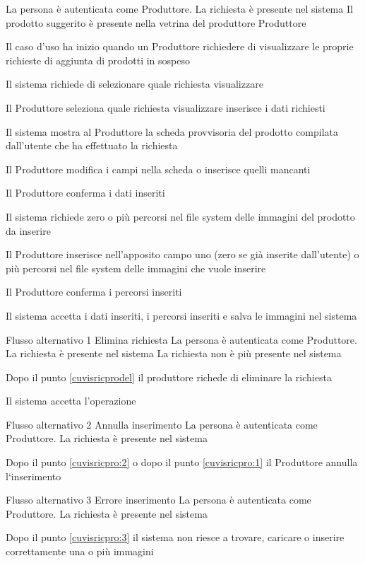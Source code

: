 {}
{La persona è autenticata come Produttore. La richiesta è presente nel sistema}
{Il prodotto suggerito è presente nella vetrina del produttore Produttore}
{\begin{enumCU}
		\item Il caso d'uso ha inizio quando un Produttore richiedere di visualizzare le proprie richieste di aggiunta di prodotti in sospeso
		\item Il sistema richiede di selezionare quale richiesta visualizzare
		\item Il Produttore seleziona quale richiesta visualizzare inserisce i dati richiesti 
		\item Il sistema mostra al Produttore la scheda provvisoria del prodotto compilata dall'utente che ha effettuato la richiesta \label{cuvisricprodel}
		\item Il Produttore modifica i campi nella scheda o inserisce quelli mancanti \label{cuvisricpro:1}
		\item Il Produttore conferma i dati inseriti
		\item Il sistema richiede zero o più percorsi nel file system delle immagini del prodotto da inserire
		\item Il Produttore inserisce nell'apposito campo uno (zero se già inserite dall'utente) o più percorsi nel file system delle immagini che vuole inserire \label{cuvisricpro:2}
		\item Il Produttore conferma i percorsi inseriti \label{cuvisricpro:3}
		\item Il sistema accetta i dati inseriti, i percorsi inseriti e salva le immagini nel sistema
	\end{enumCU}}
%
{Flusso alternativo 1}%
{Elimina richiesta}%
{La persona è autenticata come Produttore. La richiesta è presente nel sistema}%
{La richiesta non è più presente nel sistema}%
{\begin{enumCU}
		\item Dopo il punto \ref{cuvisricprodel} il produttore richede di eliminare la richiesta
		\item Il sistema accetta l'operazione
	\end{enumCU}}%
%
{Flusso alternativo 2}%
{Annulla inserimento}%
{La persona è autenticata come Produttore. La richiesta è presente nel sistema}%
{\postNulle}%
{\begin{enumCU}
		\item Dopo il punto \ref{cuvisricpro:2} o dopo il punto \ref{cuvisricpro:1} il Produttore annulla l`inserimento
	\end{enumCU}}%
%
{Flusso alternativo 3}%
{Errore inserimento}%
{La persona è autenticata come Produttore. La richiesta è presente nel sistema}%
{\postNulle}%
{\begin{enumCU}
		\item Dopo il punto \ref{cuvisricpro:3} il sistema non riesce a trovare, caricare o inserire correttamente una o più immagini
	\end{enumCU}}%

